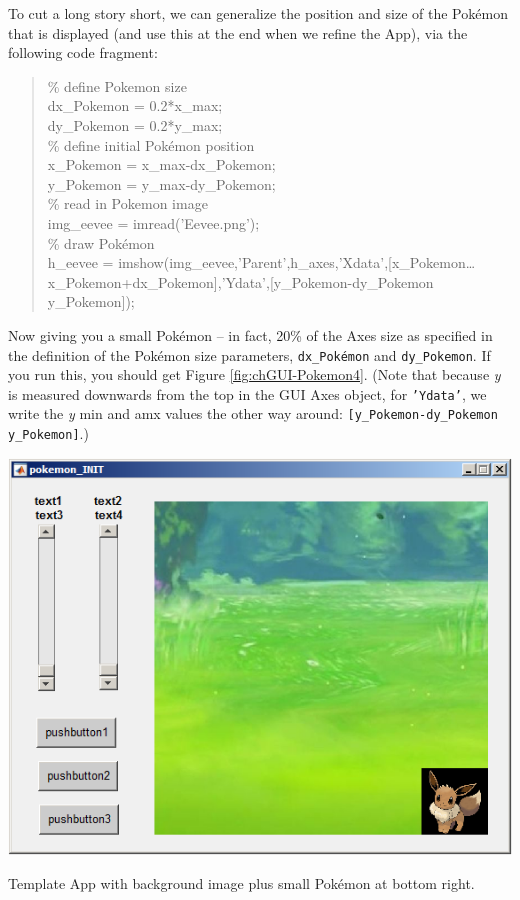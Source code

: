 \documentclass{tufte-book} %
\newenvironment{docspec}{\begin{quotation}\ttfamily\parskip0pt\parindent0pt\ignorespaces}{\end{quotation}}
\begin{document}
To cut a long story short, we can generalize the position and size of the Pok\'emon that is displayed (and use this at the end when we refine the App), via the following  code fragment:
\begin{docspec}
\textcolor[rgb]{0,0.501961,0}{\% define Pokemon size}
\\dx\_Pokemon = 0.2*x\_max;
\\dy\_Pokemon = 0.2*y\_max;
\\\textcolor[rgb]{0,0.501961,0}{\% define initial Pok\'emon position}
\\x\_Pokemon = x\_max-dx\_Pokemon;
\\y\_Pokemon = y\_max-dy\_Pokemon;
\\\textcolor[rgb]{0,0.501961,0}{\% read in Pokemon image}
\\img\_eevee = imread(\textcolor[rgb]{0.501961,0,1}{'Eevee.png'});
\\\textcolor[rgb]{0,0.501961,0}{\% draw Pok\'emon}
\\h\_eevee = imshow(img\_eevee,\textcolor[rgb]{0.501961,0,1}{'Parent'},h\_axes,\textcolor[rgb]{0.501961,0,1}{'Xdata'},[x\_Pokemon\ldots
\\ x\_Pokemon+dx\_Pokemon],\textcolor[rgb]{0.501961,0,1}{'Ydata'},[y\_Pokemon-dy\_Pokemon y\_Pokemon]);
\end{docspec}
Now giving you a small Pok\'emon -- in fact, 20\% of the \textsf{Axes} size as specified in the definition of the Pok\'emon size parameters, \texttt{dx\_Pok\'emon} and \texttt{dy\_Pokemon}. If you run this, you should get Figure \ref{fig:chGUI-Pokemon4}. (Note that because \textit{y} is measured downwards from the top in the GUI \textsf{Axes} object, for \textcolor[rgb]{0.501961,0,1}{\texttt{'Ydata'}}, we write  the \textit{y} min and amx values the other way around: \texttt{[y\_Pokemon-dy\_Pokemon y\_Pokemon]}.)
\begin{marginfigure}[0.0in]
\includegraphics[width=\linewidth]{chGUI-Pokemon4.png}
\caption{Template App with background image plus small Pok\'emon at bottom right.}
\label{fig:chGUI-Pokemon4}
\end{marginfigure}
\end{document}

